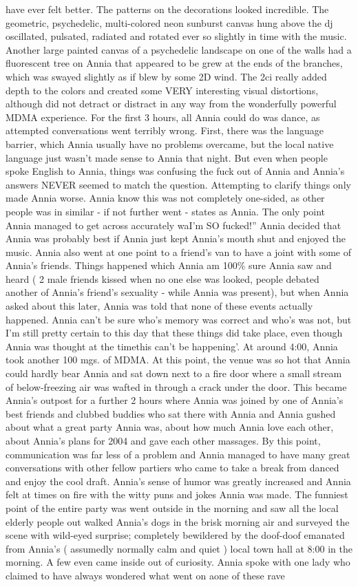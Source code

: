 \documentclass[12pt]{book}
\begin{document}
have ever felt better. The patterns on the decorations looked incredible. The geometric, psychedelic, multi-colored neon sunburst canvas hung above the dj oscillated, pulsated, radiated and rotated ever so slightly in time with the music. Another large painted canvas of a psychedelic landscape on one of the walls had a fluorescent tree on Annia that appeared to be grew at the ends of the branches, which was swayed slightly as if blew by some 2D wind. The 2ci really added depth to the colors and created some VERY interesting visual distortions, although did not detract or distract in any way from the wonderfully powerful MDMA experience. For the first 3 hours, all Annia could do was dance, as attempted conversations went terribly wrong. First, there was the language barrier, which Annia usually have no problems overcame, but the local native language just wasn't made sense to Annia that night. But even when people spoke English to Annia, things was confusing the fuck out of Annia and Annia's answers NEVER seemed to match the question. Attempting to clarify things only made Annia worse. Annia know this was not completely one-sided, as other people was in similar - if not further went - states as Annia. The only point Annia managed to get across accurately waI'm SO fucked!'' Annia decided that Annia was probably best if Annia just kept Annia's mouth shut and enjoyed the music. Annia also went at one point to a friend's van to have a joint with some of Annia's friends. Things happened which Annia am 100\% sure Annia saw and heard ( 2 male friends kissed when no one else was looked, people debated another of Annia's friend's sexuality - while Annia was present), but when Annia asked about this later, Annia was told that none of these events actually happened. Annia can't be sure who's memory was correct and who's was not, but I'm still pretty certain to this day that these things did take place, even though Annia was thought at the timethis can't be happening'. At around 4:00, Annia took another 100 mgs. of MDMA. At this point, the venue was so hot that Annia could hardly bear Annia and sat down next to a fire door where a small stream of below-freezing air was wafted in through a crack under the door. This became Annia's outpost for a further 2 hours where Annia was joined by one of Annia's best friends and clubbed buddies who sat there with Annia and Annia gushed about what a great party Annia was, about how much Annia love each other, about Annia's plans for 2004 and gave each other massages. By this point, communication was far less of a problem and Annia managed to have many great conversations with other fellow partiers who came to take a break from danced and enjoy the cool draft. Annia's sense of humor was greatly increased and Annia felt at times on fire with the witty puns and jokes Annia was made. The funniest point of the entire party was went outside in the morning and saw all the local elderly people out walked Annia's dogs in the brisk morning air and surveyed the scene with wild-eyed surprise; completely bewildered by the doof-doof emanated from Annia's ( assumedly normally calm and quiet ) local town hall at 8:00 in the morning. A few even came inside out of curiosity. Annia spoke with one lady who claimed to have always wondered what went on aone of these rave 
\end{document}
